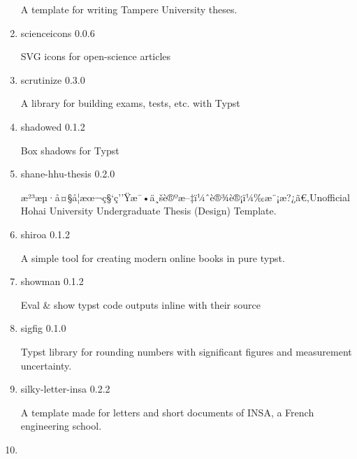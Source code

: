 \begin{enumerate}
  A template for writing Tampere University theses.
\item
  \href{/universe/package/scienceicons/}{}

  { scienceicons } { 0.0.6 }

  SVG icons for open-science articles
\item
  \href{/universe/package/scrutinize/}{}

  { scrutinize } { 0.3.0 }

  A library for building exams, tests, etc. with Typst
\item
  \href{/universe/package/shadowed/}{}

  { shadowed } { 0.1.2 }

  Box shadows for Typst
\item
  \href{/universe/package/shane-hhu-thesis/}{}


  { shane-hhu-thesis } { 0.2.0 }

  æ²³æµ·å¤§å­¦æœ¬ç§`ç''Ÿæ¯•ä¸šè®ºæ--‡ï¼ˆè®¾è®¡ï¼‰æ¨¡æ?¿ã€‚Unofficial
  Hohai University Undergraduate Thesis (Design) Template.
\item
  \href{/universe/package/shiroa/}{}

  { shiroa } { 0.1.2 }

  A simple tool for creating modern online books in pure typst.
\item
  \href{/universe/package/showman/}{}

  { showman } { 0.1.2 }

  Eval \& show typst code outputs inline with their source
\item
  \href{/universe/package/sigfig/}{}

  { sigfig } { 0.1.0 }

  Typst library for rounding numbers with significant figures and
  measurement uncertainty.
\item
  \href{/universe/package/silky-letter-insa/}{}


  { silky-letter-insa } { 0.2.2 }

  A template made for letters and short documents of INSA, a French
  engineering school.
\item
  \href{/universe/package/silky-report-insa/}{}


\end{enumerate}
